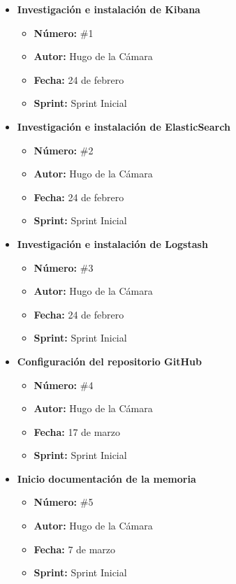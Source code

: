 \begin{itemize}
    \item \textbf{Investigación e instalación de Kibana}
    \begin{itemize}
        \item \textbf{Número:} \#1
        \item \textbf{Autor:} Hugo de la Cámara
        \item \textbf{Fecha:} 24 de febrero
        \item \textbf{Sprint:} Sprint Inicial
    \end{itemize}
    
    \item \textbf{Investigación e instalación de ElasticSearch}
    \begin{itemize}
        \item \textbf{Número:} \#2
        \item \textbf{Autor:} Hugo de la Cámara
        \item \textbf{Fecha:} 24 de febrero
        \item \textbf{Sprint:} Sprint Inicial
    \end{itemize}
    
    \item \textbf{Investigación e instalación de Logstash}
    \begin{itemize}
        \item \textbf{Número:} \#3
        \item \textbf{Autor:} Hugo de la Cámara
        \item \textbf{Fecha:} 24 de febrero
        \item \textbf{Sprint:} Sprint Inicial
    \end{itemize}
    
    \item \textbf{Configuración del repositorio GitHub}
    \begin{itemize}
        \item \textbf{Número:} \#4
        \item \textbf{Autor:} Hugo de la Cámara
        \item \textbf{Fecha:} 17 de marzo
        \item \textbf{Sprint:} Sprint Inicial
    \end{itemize}
    
    \item \textbf{Inicio documentación de la memoria}
    \begin{itemize}
        \item \textbf{Número:} \#5
        \item \textbf{Autor:} Hugo de la Cámara
        \item \textbf{Fecha:} 7 de marzo
        \item \textbf{Sprint:} Sprint Inicial
    \end{itemize}
    

\end{itemize}
